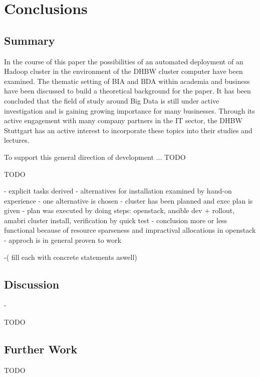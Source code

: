 \chapter{Conclusions}
\label{chap:conc}

\section{Summary}

In the course of this paper the possibilities of an automated deployment of an Hadoop cluster in the environment of the \ac{DHBW} cluster computer have been examined.
The thematic setting of \ac{BIA} and \ac{BDA} within academia and business have been discussed to build a theoretical background for the paper. 
It has been concluded that the field of study around Big Data is still under active investigation and is gaining growing importance for many businesses.
Through its active engagement with many company partners in the \ac{IT} sector, the \ac{DHBW} Stuttgart has an active interest to incorporate these topics into their studies and lectures.

To support this general direction of development ... TODO

TODO

- explicit tasks derived
- alternatives for installation examined by hand-on experience
- one alternative is chosen
- cluster has been planned and exec plan is given
- plan was executed by doing steps: openstack, ansible dev + rollout, amabri cluster install, verification by quick test
- conclusion more or less functional because of resource sparseness and impractival allocations in openstack
- approch is in general proven to work

-( fill each with concrete statements aswell)

\section{Discussion}

- 

TODO

\section{Further Work}

TODO
